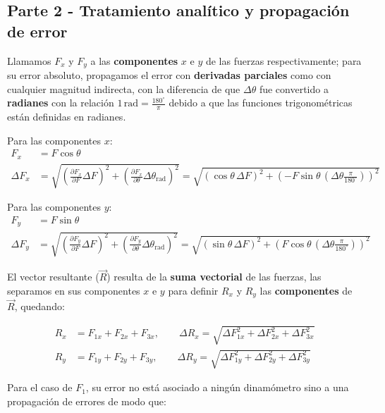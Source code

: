 \documentclass[12pt,a4paper]{article}
\begin{document}
\subsection{Parte 2 - Tratamiento analítico y propagación de error} \label{Procedimiento-Parte-2}

Llamamos $F_x$ y $F_y$ a las \textbf{componentes} $x$ e $y$ de las fuerzas respectivamente; para su error absoluto, propagamos el error con \textbf{derivadas parciales} como con cualquier magnitud indirecta, con la diferencia de que $\Delta \theta$ fue convertido a \textbf{radianes} con la relación {\large{$1 \,\mathrm{rad} = \frac{180^{\circ}}{\pi}$}} debido a que las funciones trigonométricas están definidas en radianes. 

Para las componentes $x$:
\begin{align*}
F_x &= F \cos\theta \\
\Delta F_x &= \sqrt{\left(\frac{\partial F_x}{\partial F}\Delta F\right)^2 + \left(\frac{\partial F_x}{\partial \theta}\Delta \theta_{\text{rad}}\right)^2} = \sqrt{\left(\cos\theta \, \Delta F\right)^2 + \left(-F\sin\theta \, \left(\Delta \theta \frac{\pi}{180^\circ}\right)\right)^2}
\end{align*}

Para las componentes $y$:
\begin{align*}
    F_y &= F \sin\theta \\
    \Delta F_y &= \sqrt{\left(\frac{\partial F_y}{\partial F}\Delta F\right)^2 + \left(\frac{\partial F_y}{\partial \theta}\Delta \theta_{\text{rad}}\right)^2} = \sqrt{\left(\sin\theta \, \Delta F\right)^2 + \left(F\cos\theta \, \left(\Delta \theta \frac{\pi}{180^\circ}\right)\right)^2}
\end{align*}

El vector resultante ($\vec{R}$) resulta de la \textbf{suma vectorial} de las fuerzas, las separamos en sus componentes $x$ e $y$ para definir $R_x$ y $R_y$ las \textbf{componentes} de $\vec{R}$, quedando:

\begin{align*}
R_x &= F_{1x} + F_{2x} + F_{3x}, \qquad \Delta R_x = \sqrt{\Delta F_{1x}^2 + \Delta F_{2x}^2 + \Delta F_{3x}^2} \\
R_y &= F_{1y} + F_{2y} + F_{3y}, \qquad \Delta R_y = \sqrt{\Delta F_{1y}^2 + \Delta F_{2y}^2 + \Delta F_{3y}^2}
\end{align*}

Para el caso de $F_1$, su error no está asociado a ningún dinamómetro sino a una propagación de errores de modo que:
\end{document}
